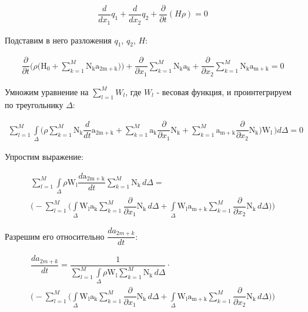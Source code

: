\documentclass[14pt]{extreport}
\begin{document}
\begin{eqnarray}
\dfrac{d}{d x_{1}} q_{1} + \dfrac{d}{d x_{2}} q_{2} + \dfrac{\partial}{\partial t}\left(H \rho\right) = 0
\end{eqnarray}


Подставим в него разложения $q_1$, $q_2$, $H$:

\begin{multline*}
\dfrac{\partial}{\partial t}\bigg(\rho \bigg(\operatorname{H_{0}}+ \sum_{k=1}^{M} \operatorname{N_{k}} \operatorname{a_{2m+k}}\bigg)\bigg)+\dfrac{\partial}{\partial x_{1}} \sum_{k=1}^{M} \operatorname{N_{k}} \operatorname{a_{k}} + \dfrac{\partial}{\partial x_{2}} \sum_{k=1}^{M} \operatorname{N_{k}} \operatorname{a_{m+k}}=0
\end{multline*}

Умножим уравнение на $\sum\limits_{l=1}^{M} W_l$, где $W_l$ - весовая функция, и проинтегрируем по треугольнику $\Delta$:

\begin{multline*}
\sum_{l=1}^{M} \int\limits_{\Delta} \bigg(\rho \sum_{k=1}^{M} \operatorname{N_{k}} \dfrac{d}{d t} \operatorname{a_{2m+k}} + \sum_{k=1}^{M} \operatorname{a_{k}} \dfrac{\partial}{\partial x_{1}} \operatorname{N_{k}} + \sum_{k=1}^{M} \operatorname{a_{m+k}} \dfrac{\partial}{\partial x_{2}} \operatorname{N_{k}}\bigg) \operatorname{W_{l}}\, \bigg)d\Delta=0
\end{multline*}

Упростим выражение:

\begin{multline*}
\sum_{l=1}^{M} \int\limits_{\Delta} \rho \operatorname{W_{l}} \dfrac{d\operatorname{a_{2m+k}}}{d t} \sum_{k=1}^{M} \operatorname{N_{k}}\, d\Delta = \\ \bigg ( - \sum_{l=1}^{M} \bigg(\int\limits_{\Delta} \operatorname{W_{l}} \operatorname{a_{k}} \sum_{k=1}^{M} \dfrac{\partial}{\partial x_{1}} \operatorname{N_{k}}\, d\Delta + \int\limits_{\Delta} \operatorname{W_{l}} \operatorname{a_{m+k}} \sum_{k=1}^{M} \dfrac{\partial}{\partial x_{2}} \operatorname{N_{k}}\, d\Delta\bigg)\bigg )
\end{multline*}

Разрешим его относительно $\dfrac{da_{2m+k}}{dt}$:

\begin{multline*}
\dfrac{da_{2m+k}}{dt}= \dfrac{1}{\sum\limits_{l=1}^{M} \int\limits_{\Delta} \rho \operatorname{W_{l}}  \sum\limits_{k=1}^{M} \operatorname{N_{k}}\, d\Delta} \cdot \\ \bigg ( - \sum_{l=1}^{M} \bigg(\int\limits_{\Delta} \operatorname{W_{l}} \operatorname{a_{k}} \sum\limits_{k=1}^{M} \dfrac{\partial}{\partial x_{1}} \operatorname{N_{k}}\, d\Delta + \int\limits_{\Delta} \operatorname{W_{l}} \operatorname{a_{m+k}} \sum_{k=1}^{M} \dfrac{\partial}{\partial x_{2}} \operatorname{N_{k}}\, d\Delta\bigg)\bigg )
\end{multline*}
\end{document}
